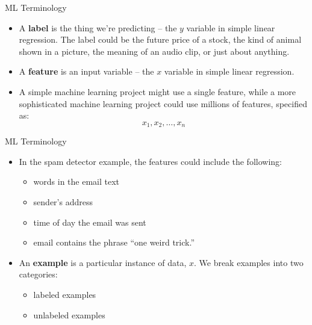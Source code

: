 \documentclass{beamer}
\begin{document}
\begin{frame}{ML Terminology}

\begin{itemize}
\item 
A {\bf label} is the thing we're predicting -- the $y$ variable in simple linear regression. The label could be the future price of a stock, the kind of animal shown in a picture, the meaning of an audio clip, or just about anything.

\item 
A {\bf feature} is an input variable -- the $x$ variable in simple linear regression. 

\item A simple machine learning project might use a single feature, while a more sophisticated machine learning project could use millions of features, specified as:   
\[
x_1,x_2,\ldots,x_n
\]
\end{itemize}

\end{frame}


\begin{frame}{ML Terminology}

\begin{itemize}
\item In the spam detector example, the features could include the following:
\begin{itemize}
\item words in the email text
\item sender's address
\item time of day the email was sent
\item email contains the phrase ``one weird trick.''
\end{itemize}

\item An {\bf example} is a particular instance of data, $x$. We break examples into two categories:
\begin{itemize}
\item
labeled examples

\item
unlabeled examples
\end{itemize}
\end{itemize}

\end{frame}

\end{document}
